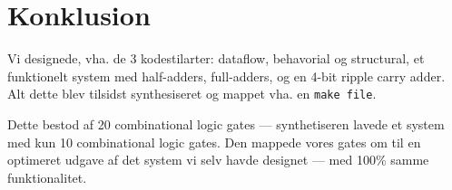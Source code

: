 \section{Konklusion}

Vi designede, vha. de 3 kodestilarter: dataflow, behavorial og structural, et funktionelt system med half-adders, full-adders, og en 4-bit ripple carry adder. Alt dette blev tilsidst synthesiseret og mappet vha. en \texttt{make file}.

Dette bestod af 20 combinational logic gates --- synthetiseren lavede et system med kun 10 combinational logic gates. Den mappede vores gates om til en optimeret udgave af det system vi selv havde designet --- med 100\% samme funktionalitet.
